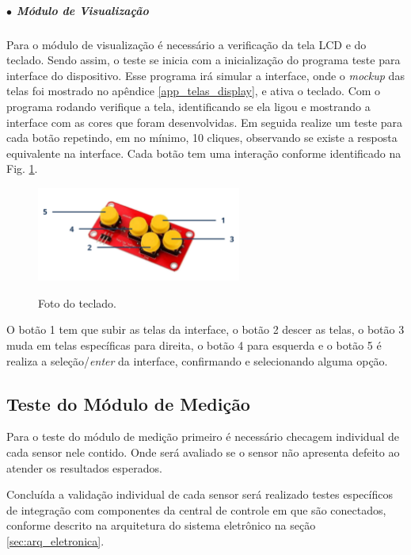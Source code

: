 \subparagraph*{$\bullet$ Módulo de Visualização} \hfill

Para o módulo de visualização é necessário a verificação da tela LCD e do teclado. Sendo assim, o teste se inicia com a inicialização do programa teste para interface do dispositivo. Esse programa irá simular a interface, onde o \textit{mockup} das telas foi mostrado no apêndice \ref{app_telas_display}, e ativa o teclado. Com o programa rodando verifique a tela, identificando se ela ligou e mostrando a interface com as cores que foram desenvolvidas. Em seguida realize um teste para cada botão repetindo, em no mínimo, 10 cliques, observando se existe a resposta equivalente na interface. Cada botão tem uma interação conforme identificado na Fig. \ref{fig:botoes_identificados}.

\begin{figure}[H]
    \centering
    {\includegraphics[width=0.6\textwidth]{figuras/eletronica/fotos_componentes/num_teclado.png}}
    \caption{Foto do teclado.} %
    \label{fig:botoes_identificados}
\end{figure}

O botão 1 tem que subir as telas da interface, o botão 2 descer as telas, o botão 3 muda em telas específicas para direita, o botão 4 para esquerda e o botão 5 é realiza a seleção/\textit{enter} da interface, confirmando e selecionando alguma opção. 

\subsection{Teste do Módulo de Medição}

Para o teste do módulo de medição primeiro é necessário checagem individual de cada sensor nele contido. Onde será avaliado se o sensor não apresenta defeito ao atender os resultados esperados.

Concluída a validação individual de cada sensor será realizado testes específicos de integração com componentes da central de controle em que são conectados, conforme descrito na arquitetura do sistema eletrônico na seção \ref{sec:arq_eletronica}.

